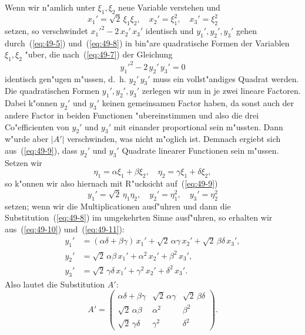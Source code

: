\documentclass[12pt,a4paper]{article}
\theoremstyle{definition}
\begin{document}
Wenn wir n"amlich unter $\xi_1, \xi_2$ neue Variable verstehen und
\begin{equation}\label{eq:49-8}
x_1' = \sqrt{2}\,\xi_1\xi_2, \quad x_2' = \xi_1^2, \quad x_3' = \xi_2^2
\end{equation}
setzen, so verschwindet $x_1'^2 - 2\,x_2'\,x_3'$ identisch und $y_1', y_2', y_3'$ gehen durch~(\ref{eq:49-5}) und~(\ref{eq:49-8}) in bin"are quadratische Formen der Variablen $\xi_1, \xi_2$ "uber, die nach~(\ref{eq:49-7}) der Gleichung
\begin{equation}\label{eq:49-9}
y_1'^2 - 2\,y_2'\,y_3' = 0
\end{equation}
identisch gen"ugen m"ussen, d.~h. $y_2'\,y_3'$ muss ein vollst"andiges Quadrat werden. Die quadratischen Formen $y_1', y_2', y_3'$ zerlegen wir nun in je zwei lineare Factoren. Dabei k"onnen $y_2'$ und $y_3'$ keinen gemeinsamen Factor haben, da sonst auch der andere Factor in beiden Functionen "ubereinstimmen und also die drei Co"efficienten von $y_2'$ und $y_3'$ mit einander proportional sein m"ussten. Dann w"urde aber $|A'|$ verschwinden, was nicht m"oglich ist. Demnach ergiebt sich aus~(\ref{eq:49-9}), dass $y_2'$ und $y_3'$ Quadrate linearer Functionen sein m"ussen. Setzen wir
\begin{equation}\label{eq:49-10}
\eta_1 = \alpha\xi_1 + \beta\xi_2, \quad \eta_2 = \gamma\xi_1 + \delta\xi_2,
\end{equation}
so k"onnen wir also hiernach mit R"ucksicht auf~(\ref{eq:49-9})
\begin{equation}\label{eq:49-11}
y_1' = \sqrt{2}\,\eta_1\eta_2, \quad y_2' = \eta_1^2, \quad y_3' = \eta_2^2
\end{equation}
setzen; wenn wir die Multiplicationen ausf"uhren und dann die Substitution~(\ref{eq:49-8}) im umgekehrten Sinne ausf"uhren, so erhalten wir aus~(\ref{eq:49-10}) und~(\ref{eq:49-11}):
\begin{align*}
y_1' &= (\alpha\delta + \beta\gamma)\,x_1' + \sqrt{2}\,\alpha\gamma\,x_2' + \sqrt{2}\,\beta\delta\,x_3', \\
y_2' &= \sqrt{2}\,\alpha\beta\,x_1' + \alpha^2\,x_2' + \beta^2\,x_3', \\
y_3' &= \sqrt{2}\,\gamma\delta\,x_1' + \gamma^2\,x_2' + \delta^2\,x_3'.
\end{align*}
Also lautet die Substitution $A'$:
\begin{equation}\label{eq:49-12}
A' = \begin{pmatrix}
\alpha\delta + \beta\gamma & \sqrt{2}\,\alpha\gamma & \sqrt{2}\,\beta\delta \\[4pt]
\sqrt{2}\,\alpha\beta & \alpha^2 & \beta^2 \\[4pt]
\sqrt{2}\,\gamma\delta & \gamma^2 & \delta^2
\end{pmatrix}.
\end{equation}
\end{document}
